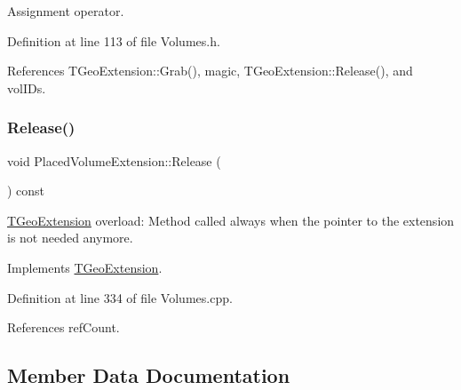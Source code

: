 Assignment operator. 



Definition at line 113 of file Volumes.\+h.



References T\+Geo\+Extension\+::\+Grab(), magic, T\+Geo\+Extension\+::\+Release(), and vol\+I\+Ds.

\hypertarget{class_d_d4hep_1_1_geometry_1_1_placed_volume_extension_a7a32d8e82885c18e196ff79349e58737}{}\label{class_d_d4hep_1_1_geometry_1_1_placed_volume_extension_a7a32d8e82885c18e196ff79349e58737} 
\subsubsection{\texorpdfstring{Release()}{Release()}}
{\footnotesize\ttfamily void Placed\+Volume\+Extension\+::\+Release (\begin{DoxyParamCaption}{ }\end{DoxyParamCaption}) const\hspace{0.3cm}{\ttfamily [virtual]}}



\hyperlink{class_t_geo_extension}{T\+Geo\+Extension} overload\+: Method called always when the pointer to the extension is not needed anymore. 



Implements \hyperlink{class_t_geo_extension_af3013d9059744f1d7f9f9037a57bf3da}{T\+Geo\+Extension}.



Definition at line 334 of file Volumes.\+cpp.



References ref\+Count.



\subsection{Member Data Documentation}
\hypertarget{class_d_d4hep_1_1_geometry_1_1_placed_volume_extension_a1da5d313250546dc6deb19ed39b9ee90}{}\label{class_d_d4hep_1_1_geometry_1_1_placed_volume_extension_a1da5d313250546dc6deb19ed39b9ee90} 

